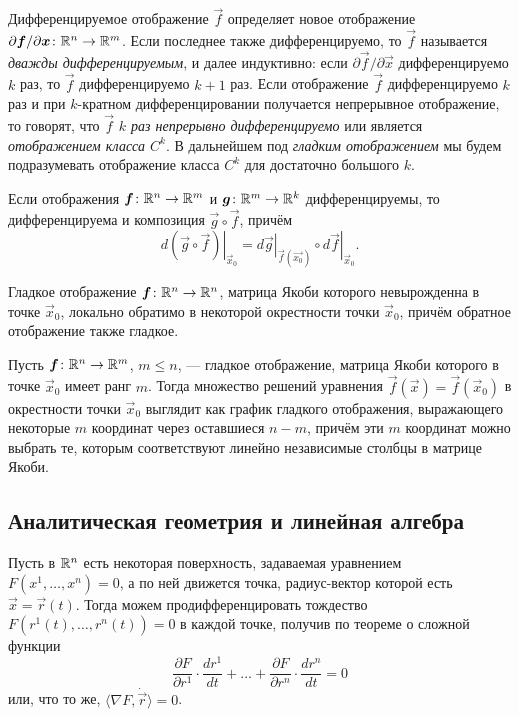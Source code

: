 Дифференцируемое отображение $\vec{f}$ определяет новое отображение $\partial \boldsymbol{f} / \partial \boldsymbol{x}\colon \mathbb{R}^n \to \mathbb{R}^m$. Если последнее также дифференцируемо, то $\vec{f}$ называется \textit{дважды дифференцируемым}, и далее индуктивно: если $\partial\vec{f} / \partial\vec{x}$ дифференцируемо $k$ раз, то $\vec{f}$ дифференцируемо $k + 1$ раз. Если отображение $\vec{f}$ дифференцируемо $k$ раз и при $k$-кратном дифференцировании получается непрерывное отображение, то говорят, что $\vec{f}$ \textit{$k$ раз непрерывно дифференцируемо} или является \textit{отображением класса $C^k$}. В дальнейшем под \textit{гладким отображением} мы будем подразумевать отображение класса $C^k$ для достаточно большого $k$.

\begin{theorem}
	Если отображения $\boldsymbol{f}\colon \mathbb{R}^n \to \mathbb{R}^m$ и $\boldsymbol{g}\colon \mathbb{R}^m \to \mathbb{R}^k$ дифференцируемы, то дифференцируема и композиция $\vec{g} \circ \vec{f}$, причём
	\[
		\left.d(\vec{g} \circ \vec{f})\right|_{\vec{x}_0} = \left.d\vec{g}\right|_{\vec{f}(\vec{x_0})} \circ \left.d\vec{f}\right|_{\vec{x}_0}.
	\]
\end{theorem}

\begin{theorem}
	Гладкое отображение $\boldsymbol{f}\colon \mathbb{R}^n \to \mathbb{R}^n$, матрица Якоби которого невырожденна в точке $\vec{x}_0$, локально обратимо в некоторой окрестности точки $\vec{x}_0$, причём обратное отображение также гладкое.
\end{theorem}

\begin{theorem}
	Пусть $\boldsymbol{f}\colon \mathbb{R}^n \to \mathbb{R}^m$, $m \leqslant n$, --- гладкое отображение, матрица Якоби которого в точке $\vec{x}_0$ имеет ранг $m$. Тогда множество решений уравнения $\vec{f}(\vec{x}) = \vec{f}(\vec{x}_0)$ в окрестности точки $\vec{x}_0$ выглядит как график гладкого отображения, выражающего некоторые $m$ координат через оставшиеся $n - m$, причём эти $m$ координат можно выбрать те, которым соответствуют линейно независимые столбцы в матрице Якоби.
\end{theorem}

\subsection*{Аналитическая геометрия и линейная алгебра}

Пусть в $\mathbb{R}^n$ есть некоторая поверхность, задаваемая уравнением $F(x^1, \ldots, x^n) = 0$, а по ней движется точка, радиус-вектор которой есть $\vec{x} = \vec{r}(t)$. Тогда можем продифференцировать тождество $F(r^1(t), \ldots, r^n(t)) = 0$ в каждой точке, получив по теореме о сложной функции
\[
	\frac{\partial F}{\partial r^1} \cdot \frac{d r^1}{dt} + \ldots + \frac{\partial F}{\partial r^n} \cdot \frac{d r^n}{dt} = 0
\]
или, что то же, $\langle \nabla F, \dot{\vec{r}} \rangle = 0$.

